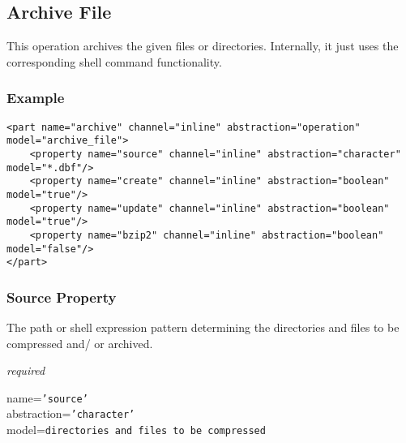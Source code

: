 %
%
%
%
%
%

\subsection{Archive File}
\label{archive_file_heading}

This operation archives the given files or directories. Internally, it just
uses the corresponding shell command functionality.

\subsubsection{Example}

\begin{scriptsize}
    \begin{verbatim}
<part name="archive" channel="inline" abstraction="operation" model="archive_file">
    <property name="source" channel="inline" abstraction="character" model="*.dbf"/>
    <property name="create" channel="inline" abstraction="boolean" model="true"/>
    <property name="update" channel="inline" abstraction="boolean" model="true"/>
    <property name="bzip2" channel="inline" abstraction="boolean" model="false"/>
</part>
    \end{verbatim}
\end{scriptsize}

\subsubsection{Source Property}

The path or shell expression pattern determining the directories and files to
be compressed and/ or archived.

\emph{required}

name=\texttt{'source'}\\
abstraction=\texttt{'character'}\\
model=\texttt{directories and files to be compressed}

